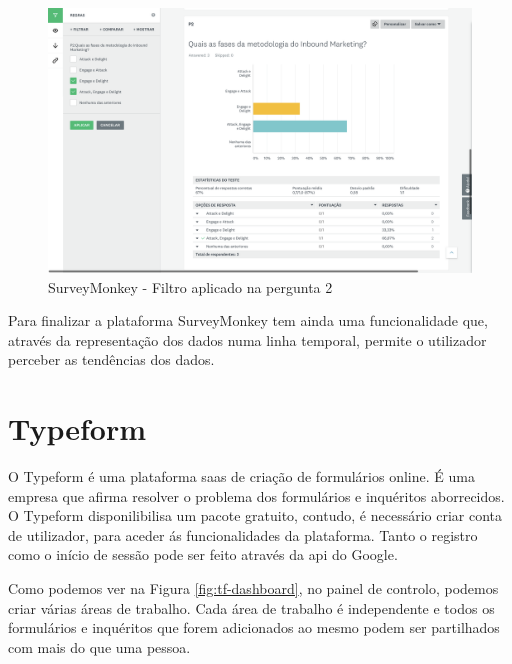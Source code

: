 \begin{figure}[ht!]
	\begin{center}
		\includegraphics[width=1\textwidth]{img/sm/surveymonkey-form-filtro1}
		\caption{SurveyMonkey - Filtro aplicado na pergunta 2 }
		\label{fig:surveymonkey-form-filtro1}
	\end{center}
\end{figure}

\newpage

Para finalizar a plataforma SurveyMonkey tem ainda uma funcionalidade que, através da representação dos dados numa linha temporal, permite o utilizador perceber as tendências dos dados.

\section{Typeform}
\label{typeform}

O Typeform é uma plataforma \acrshort{saas} de criação de formulários online. É uma empresa que afirma resolver o problema dos formulários e inquéritos aborrecidos.
O Typeform disponilibilisa um pacote gratuito, contudo, é necessário criar conta de utilizador, para aceder ás funcionalidades da plataforma. Tanto o registro como o início de sessão pode ser feito através da \acrfull{api} do Google.

Como podemos ver na Figura \ref{fig:tf-dashboard}, no painel de controlo, podemos criar várias áreas de trabalho. Cada área de trabalho é independente e todos os formulários e inquéritos que forem adicionados ao mesmo podem ser partilhados com mais do que uma pessoa.
\newpage

